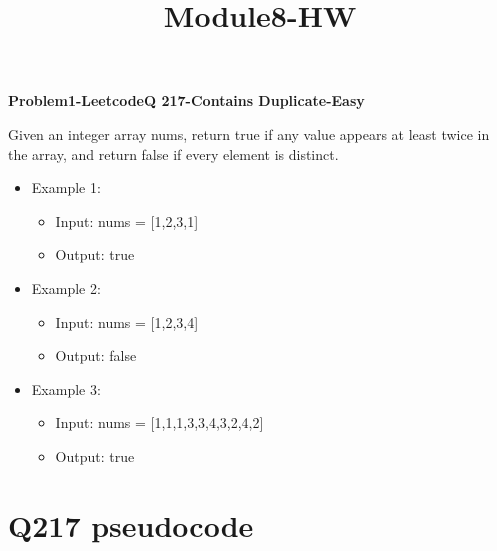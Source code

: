 \documentclass[11pt]{article}
\title{Module8-HW}
\providecommand{\tightlist}{%
      \setlength{\itemsep}{0pt}\setlength{\parskip}{0pt}}
\begin{document}
    
    \maketitle
    
    

    
    \textbf{Problem1-LeetcodeQ 217-Contains Duplicate-Easy}

Given an integer array nums, return true if any value appears at least
twice in the array, and return false if every element is distinct.

\begin{itemize}
\tightlist
\item
  Example 1:

  \begin{itemize}
  \tightlist
  \item
    Input: nums = {[}1,2,3,1{]}
  \item
    Output: true
  \end{itemize}
\item
  Example 2:

  \begin{itemize}
  \tightlist
  \item
    Input: nums = {[}1,2,3,4{]}
  \item
    Output: false
  \end{itemize}
\item
  Example 3:

  \begin{itemize}
  \tightlist
  \item
    Input: nums = {[}1,1,1,3,3,4,3,2,4,2{]}
  \item
    Output: true
  \end{itemize}
\end{itemize}

    \section{Q217 pseudocode}\label{q217-pseudocode}
\end{document}
